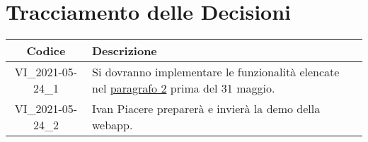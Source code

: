 \section*{Tracciamento delle Decisioni}

\begin{center}
	\begin{longtable}{|c|p{13cm}|}
	\hline
	\rowcolor{lighter-grayer}
	\textbf{Codice} & \textbf{Descrizione} \\
	\hline
	\endfirsthead

	\hline
	VI\_2021-05-24\_1 & Si dovranno implementare le funzionalità elencate nel \hyperlink{link1}{paragrafo 2} prima del 31 maggio. \\
	\hline
	VI\_2021-05-24\_2 & Ivan Piacere preparerà e invierà la demo della webapp. \\
	\hline

	\end{longtable}
\end{center}